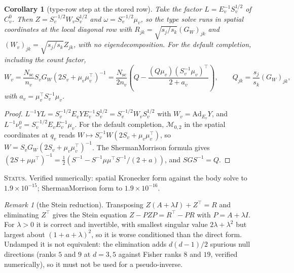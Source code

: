 \documentclass[11pt]{article}
\newtheorem{corollary}[theorem]{Corollary}
\theoremstyle{definition}
\theoremstyle{remark}
\newtheorem{remark}[theorem]{Remark}
\newcommand{\Ad}{\mathrm{Ad}}
\newcommand{\Nsc}{N_{\mathrm{sc}}}
\newcommand{\ndash}{\textendash}
\newcommand{\status}[1]{\par\smallskip\noindent\textsc{Status.} #1\par\smallskip}
\begin{document}
\begin{corollary}[type-row step at the stored row]\label{cor:type}
Take the factor $L=E_v^{-1}S_v^{1/2}$ of $C^0_v$. Then $Z=S_v^{-1/2}W_vS_v^{1/2}$ and $\omega=S_v^{-1/2}\mu_v$, so the type solve runs in spatial coordinates at the local diagonal row with $R_{jk}=\sqrt{s_j/s_k}(G_W)_{jk}$ and $(W_v)_{jk}=\sqrt{s_j/s_k}Z_{jk}$, with no eigendecomposition. For the default completion, including the count factor,
\begin{equation}\label{eq:type-step}
W_v=\frac{\Nsc}{n_v}S_vG_W\left(2S_v+\mu_v\mu_v^\top\right)^{-1}=\frac{\Nsc}{2n_v}\left(Q-\frac{(Q\mu_v)(S_v^{-1}\mu_v)^\top}{2+a_v}\right),\qquad Q_{jk}=\frac{s_j}{s_k}(G_W)_{jk},
\end{equation}
with $a_v=\mu_v^\top S_v^{-1}\mu_v$.
\end{corollary}
\begin{proof}
$L^{-1}YL=S_v^{-1/2}E_vYE_v^{-1}S_v^{1/2}=S_v^{-1/2}W_vS_v^{1/2}$ with $W_v=\Ad_{E_v}Y$, and $L^{-1}\nu^0_v=S_v^{-1/2}E_vE_v^{-1}\mu_v$. For the default completion, $\mathcal{M}_{0,2}$ in the spatial coordinates at $q_v$ reads $W\mapsto S_v^{-1}W(2S_v+\mu_v\mu_v^\top)$, so $W=S_vG_W(2S_v+\mu_v\mu_v^\top)^{-1}$. The Sherman\ndash Morrison formula \cite{ShermanMorrison1950} gives $(2S+\mu\mu^\top)^{-1}=\frac12\left(S^{-1}-S^{-1}\mu\mu^\top S^{-1}/(2+a)\right)$, and $SGS^{-1}=Q$.
\end{proof}
\status{Verified numerically: spatial Kronecker form against the body solve to $1.9\times10^{-15}$; Sherman\ndash Morrison form to $1.9\times10^{-16}$.}

\begin{remark}[the Stein reduction]\label{rem:stein}
Transposing $Z(A+\lambda I)+Z^\top=R$ and eliminating $Z^\top$ gives the Stein equation $Z-PZP=R^\top-PR$ with $P=A+\lambda I$. For $\lambda>0$ it is correct and invertible, with smallest singular value $2\lambda+\lambda^2$ but largest about $(1+a+\lambda)^2$, so it is worse conditioned than the direct form. Undamped it is not equivalent: the elimination adds $d(d-1)/2$ spurious null directions (ranks $5$ and $9$ at $d=3,5$ against Fisher ranks $8$ and $19$, verified numerically), so it must not be used for a pseudo-inverse.
\end{remark}
\end{document}
